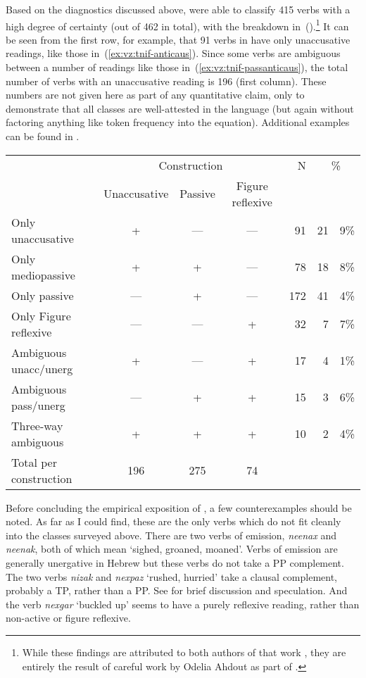 Based on the diagnostics discussed above, \cite{ahdoutkastner19nels} were able to classify 415 verbs with a high degree of certainty (out of 462 in total), with the breakdown in~(\nextx).\footnote{While these findings are attributed to both authors of that work \citep{ahdoutkastner19nels}, they are entirely the result of careful work by Odelia Ahdout as part of \citep{ahdout19phd}.} It can be seen from the first row, for example, that 91 verbs in {\tnif} have only unaccusative readings, like those in~(\ref{ex:vz:tnif-anticaus}). Since some verbs are ambiguous between a number of readings like those in~(\ref{ex:vz:tnif-passanticaus}), the total number of verbs with an unaccusative reading is 196 (first column). These numbers are not given here as part of any quantitative claim, only to demonstrate that all classes are well-attested in the language (but again without factoring anything like token frequency into the equation). Additional examples can be found in \cite{ahdoutkastner19nels}.

\ex
\begin{tabular}{l|ccc|r|r@{.}l}
				& \multicolumn{3}{c|}{Construction}	& N	& \multicolumn{2}{c}{\%} \\
				 	& Unaccusative	& Passive & Figure reflexive & & \multicolumn{2}{c}{} \\\hline\hline
Only unaccusative			&	+			& ---			&	---		&	91	&	21&9\% \\
Only mediopassive			&	+			& +				& ---		&	78	&	18&8\% \\
Only passive					&	---			& +				&	---		&	172	& 41&4\% \\\hline
Only Figure reflexive		& ---			& ---			& +			& 32	& 7&7\% \\\hline
Ambiguous unacc/unerg	& +				& ---			& +			& 17	& 4&1\% \\
Ambiguous pass/unerg	& ---			& +				& +			& 15	& 3&6\% \\
Three-way ambiguous		& +				& +				& +			& 10	& 2&4\% \\\hline\hline
Total per construction		& 196		&	275				& 74 & \multicolumn{3}{l}{} \\

\end{tabular}
\xe

Before concluding the empirical exposition of {\tnif}, a few counterexamples should be noted. As far as I could find, these are the only verbs which do not fit cleanly into the classes surveyed above. There are two verbs of emission, \emph{neenax} and \emph{neenak}, both of which mean `sighed, groaned, moaned'. Verbs of emission are generally unergative in Hebrew \citep{siloni12,gafter14li} but these verbs do not take a PP complement. The two verbs \emph{nizak} and \emph{nexpaz} `rushed, hurried' take a clausal complement, probably a TP, rather than a PP. See \citet[126]{kastner16phd} for brief discussion and speculation. And the verb \emph{nexgar} `buckled up' seems to have a purely reflexive reading, rather than non-active or figure reflexive.

